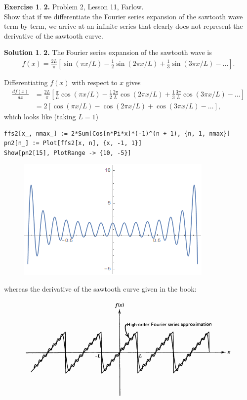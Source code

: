 \documentclass{article}
\theoremstyle{definition}
\newtheorem*{exer*}{Exercise}
\newtheorem*{sln*}{Solution}
\newcommand{\f}[2]{\frac{#1}{#2}}
\newcommand{\lb}{\left[}
\newcommand{\rb}{\right]}
\begin{document}
\begin{exer*}\textbf{2. }Problem 2, Lesson 11, Farlow.\\
	
	Show that if we differentiate the Fourier series expansion of the sawtooth wave term by term, we arrive at an infinite series that clearly does not represent the derivative of the sawtooth curve. 
	
	\begin{sln*}\textbf{2. }
	The Fourier series expansion of the sawtooth wave is
		\begin{align*}
		f(x) = \f{2L}{\pi}\lb \sin(\pi x/L) - \f{1}{2}\sin(2\pi x/L) + \f{1}{3}\sin(3\pi x/L) - \dots \rb.
		\end{align*}
		
	Differentiating $f(x)$ with respect to $x$ gives
	\begin{align*}
	\f{df(x)}{dx} &= \f{2L}{\pi}\lb \f{\pi}{L}\cos(\pi x/L) - \f{1}{2}\f{2\pi}{L}\cos(2\pi x/L) + \f{1}{3}\f{3\pi}{L}\cos(3\pi x/L) - \dots  \rb\\
	&= 2\lb \cos(\pi x/L) - \cos(2\pi x/L) + \cos(3\pi x/L)   - \dots  \rb,
	\end{align*}
	which looks like (taking $L=1$)
	
	\begin{lstlisting}
ffs2[x_, nmax_] := 2*Sum[Cos[n*Pi*x]*(-1)^(n + 1), {n, 1, nmax}]
pn2[n_] := Plot[ffs2[x, n], {x, -1, 1}]
Show[pn2[15], PlotRange -> {10, -5}]
	\end{lstlisting}

	\begin{figure}[h!]
		\centering
		\includegraphics[scale=0.45]{der.png}
	\end{figure}	

	whereas the derivative of the sawtooth curve given in the book:\\
	\begin{figure}[h!]
		\centering
		\includegraphics[scale=0.45]{saw.png}
	\end{figure}
 

\end{sln*}
\end{exer*}
\end{document}
